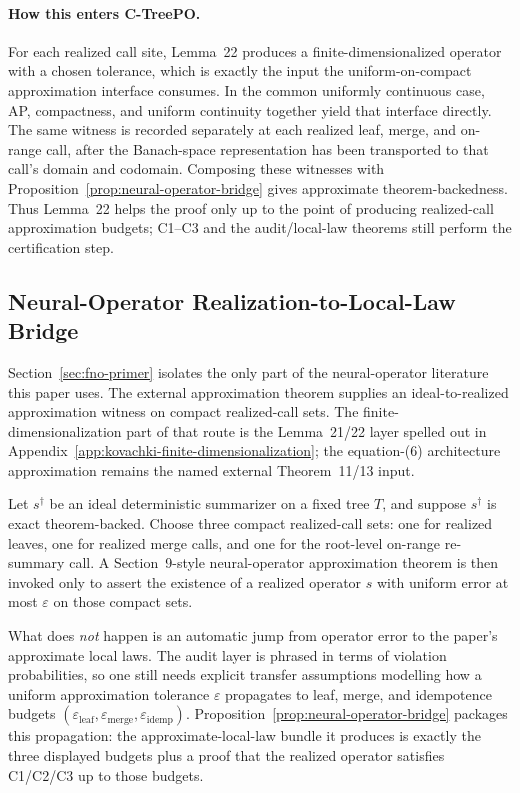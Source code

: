 \paragraph{How this enters C-TreePO.}
For each realized call site, Lemma~22 produces a finite-dimensionalized
operator with a chosen tolerance, which is exactly the input the
uniform-on-compact approximation interface consumes. In the common
uniformly continuous case, AP, compactness, and uniform continuity
together yield that interface directly. The same witness is recorded
separately at each realized leaf, merge, and on-range call, after the
Banach-space representation has been transported to that call's domain
and codomain. Composing these witnesses with
Proposition~\ref{prop:neural-operator-bridge} gives approximate
theorem-backedness. Thus Lemma~22 helps the proof only up to the point
of producing realized-call approximation budgets; C1--C3 and the
audit/local-law theorems still perform the certification step.

\subsection{Neural-Operator Realization-to-Local-Law Bridge}\label{app:approx-via-neural-operators}

Section~\ref{sec:fno-primer} isolates the only part of the neural-operator
literature this paper uses. The external approximation theorem supplies an
ideal-to-realized approximation witness on compact realized-call sets. The
finite-dimensionalization part of that route is the Lemma~21/22 layer
spelled out in Appendix~\ref{app:kovachki-finite-dimensionalization}; the
equation-(6) architecture approximation remains the named external
Theorem~11/13 input.

Let $s^\dagger$ be an ideal deterministic summarizer on a fixed tree $T$,
and suppose $s^\dagger$ is exact theorem-backed. Choose three compact
realized-call sets: one for realized leaves, one for realized merge calls,
and one for the root-level on-range re-summary call. A Section~9-style
neural-operator approximation theorem is then invoked only to assert the
existence of a realized operator $s$ with uniform error at most
$\varepsilon$ on those compact sets.

What does \emph{not} happen is an automatic jump from operator error to
the paper's approximate local laws. The audit layer is phrased in terms
of violation probabilities, so one still needs explicit transfer
assumptions modelling how a uniform approximation tolerance $\varepsilon$
propagates to leaf, merge, and idempotence budgets
$(\varepsilon_{\mathrm{leaf}}, \varepsilon_{\mathrm{merge}},
\varepsilon_{\mathrm{idemp}})$. Proposition~\ref{prop:neural-operator-bridge}
packages this propagation: the approximate-local-law bundle it produces
is exactly the three displayed budgets plus a proof that the realized
operator satisfies C1/C2/C3 up to those budgets.

